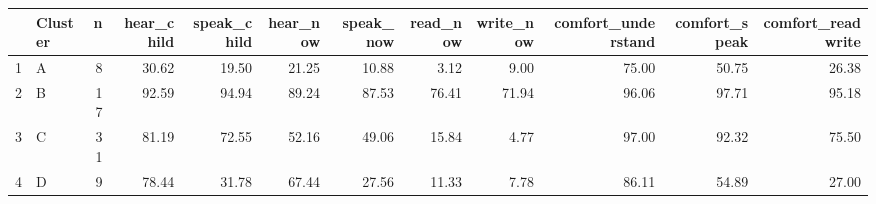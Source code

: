 \begin{table}[ht]
\centering
\begin{tabular}{rlrrrrrrrrrr}
  \hline
 & Cluster & n & hear\_child & speak\_child & hear\_now & speak\_now & read\_now & write\_now & comfort\_understand & comfort\_speak & comfort\_readwrite \\ 
  \hline
1 & A &   8 & 30.62 & 19.50 & 21.25 & 10.88 & 3.12 & 9.00 & 75.00 & 50.75 & 26.38 \\ 
  2 & B &  17 & 92.59 & 94.94 & 89.24 & 87.53 & 76.41 & 71.94 & 96.06 & 97.71 & 95.18 \\ 
  3 & C &  31 & 81.19 & 72.55 & 52.16 & 49.06 & 15.84 & 4.77 & 97.00 & 92.32 & 75.50 \\ 
  4 & D &   9 & 78.44 & 31.78 & 67.44 & 27.56 & 11.33 & 7.78 & 86.11 & 54.89 & 27.00 \\ 
   \hline
\end{tabular}
\end{table}
